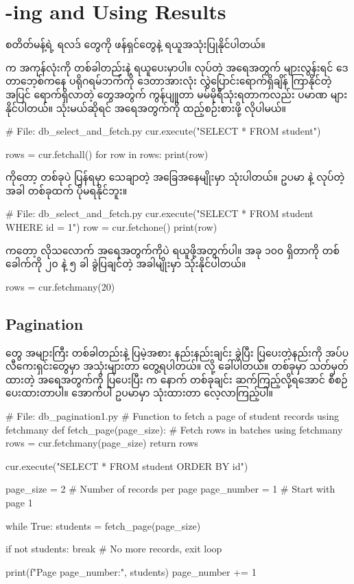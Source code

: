 \section{-ing and Using Results}
 စတိတ်မန့်ရဲ့ ရလဒ်  တွေကို \fEn{,} \fEn{,}  ဖန်ရှင်တွေနဲ့ ရယူအသုံးပြုနိုင်ပါတယ်။ 

 က  အကုန်လုံးကို တစ်ခါတည်းနဲ့ ရယူပေးမှာပါ။  လုပ်တဲ့  အရေအတွက် များလွန်းရင် ဒေတာဘေ့စ်ကနေ  ပရိုဂရမ်ဘက်ကို ဒေတာအားလုံး လွှဲပြောင်းရောက်ရှိချိန် ကြာနိုင်တဲ့အပြင် ရောက်ရှိလာတဲ့  တွေအတွက် ကွန်ပျူတာ မမ်မိုရီသုံးရတာကလည်း ပမာဏ များနိုင်ပါတယ်။  သုံးမယ်ဆိုရင်  အရေအတွက်ကို ထည့်စဉ်းစားဖို့ လိုပါမယ်။
%
\begin{py}
# File: db_select_and_fetch.py
cur.execute("SELECT * FROM student")

rows = cur.fetchall()
for row in rows:
    print(row)
\end{py}
%

 ကိုတော့  တစ်ခုပဲ ပြန်ရမှာ သေချာတဲ့ အခြေအနေမျိုးမှာ သုံးပါတယ်။ ဥပမာ  နဲ့  လုပ်တဲ့အခါ  တစ်ခုထက် ပိုမရနိုင်ဘူး။
%
\begin{py}
# File: db_select_and_fetch.py
cur.execute("SELECT * FROM student WHERE id = 1")
row = cur.fetchone()
print(row)
\end{py}
% 

 ကတော့ လိုသလောက်  အရေအတွက်ကိုပဲ ရယူဖို့အတွက်ပါ။  အခု ၁၀၀ ရှိတာကို တစ်ခေါက်ကို ၂၀ နဲ့ ၅ ခါ ခွဲပြချင်တဲ့ အခါမျိုးမှာ သုံးနိုင်ပါတယ်။ 
%
\begin{py}
rows = cur.fetchmany(20)
\end{py}
%

\subsection*{Pagination}
 တွေ အများကြီး တစ်ခါတည်းနဲ့ ပြမဲ့အစား နည်းနည်းချင်း ခွဲပြီး ပြပေးတဲ့နည်းကို အပ်ပလီကေးရှင်းတွေမှာ အသုံးများတာ တွေ့ရပါတယ်။  လို့ ခေါ်ပါတယ်။  တစ်ခုမှာ သတ်မှတ်ထားတဲ့  အရေအတွက်ကို ပြပေးပြီး  က နောက်  တစ်ခုချင်း ဆက်ကြည့်လို့ရအောင် စီစဉ်ပေးထားတာပါ။ အောက်ပါ ဥပမာမှာ  သုံးထားတာ လေ့လာကြည့်ပါ။

%
\begin{py}
# File: db_pagination1.py
# Function to fetch a page of student records using fetchmany
def fetch_page(page_size):
    # Fetch rows in batches using fetchmany
    rows = cur.fetchmany(page_size)
    return rows

cur.execute("SELECT * FROM student ORDER BY id")

page_size = 2    # Number of records per page
page_number = 1  # Start with page 1

while True:
    students = fetch_page(page_size)
    
    if not students:
        break  # No more records, exit loop
    
    print(f"Page {page_number}:", students)
    page_number += 1
\end{py}
%

